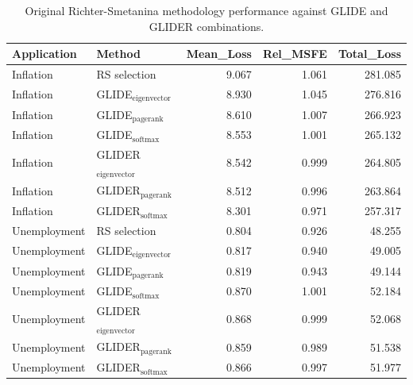\begin{table}
\caption{Original Richter-Smetanina methodology performance against GLIDE and GLIDER combinations.}
\label{tab:rs-original-methodology-performance}
\begin{tabular}{llrrr}
\toprule
Application & Method & Mean_Loss & Rel_MSFE & Total_Loss \\
\midrule
Inflation & RS selection & 9.067 & 1.061 & 281.085 \\
Inflation & GLIDE$_{\mathrm{eigenvector}}$ & 8.930 & 1.045 & 276.816 \\
Inflation & GLIDE$_{\mathrm{pagerank}}$ & 8.610 & 1.007 & 266.923 \\
Inflation & GLIDE$_{\mathrm{softmax}}$ & 8.553 & 1.001 & 265.132 \\
Inflation & GLIDER$_{\mathrm{eigenvector}}$ & 8.542 & 0.999 & 264.805 \\
Inflation & GLIDER$_{\mathrm{pagerank}}$ & 8.512 & 0.996 & 263.864 \\
Inflation & GLIDER$_{\mathrm{softmax}}$ & 8.301 & 0.971 & 257.317 \\
Unemployment & RS selection & 0.804 & 0.926 & 48.255 \\
Unemployment & GLIDE$_{\mathrm{eigenvector}}$ & 0.817 & 0.940 & 49.005 \\
Unemployment & GLIDE$_{\mathrm{pagerank}}$ & 0.819 & 0.943 & 49.144 \\
Unemployment & GLIDE$_{\mathrm{softmax}}$ & 0.870 & 1.001 & 52.184 \\
Unemployment & GLIDER$_{\mathrm{eigenvector}}$ & 0.868 & 0.999 & 52.068 \\
Unemployment & GLIDER$_{\mathrm{pagerank}}$ & 0.859 & 0.989 & 51.538 \\
Unemployment & GLIDER$_{\mathrm{softmax}}$ & 0.866 & 0.997 & 51.977 \\
\bottomrule
\end{tabular}
\end{table}
